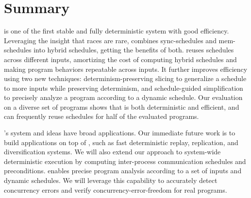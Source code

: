 \section{Summary} \label{sec:peregrine-summary}

\peregrine is one of the first stable and fully deterministic system with good
efficiency.
Leveraging the insight that races are rare, \peregrine combines sync-schedules
and mem-schedules into hybrid schedules, getting the benefits of both.
\peregrine reuses schedules across different inputs, amortizing the cost of
computing hybrid schedules and making program behaviors repeatable
across inputs.  It further improves
efficiency using two new techniques: determinism-preserving slicing to
generalize a schedule to more inputs while preserving determinism, and
schedule-guided simplification to precisely analyze a program according
to a dynamic schedule.  Our evaluation on a diverse set of programs
shows that \peregrine is both deterministic and efficient, and can frequently
reuse schedules for half of the evaluated programs.


\peregrine's system and ideas have broad applications.  Our immediate future
work is to build applications on top of \peregrine, such as fast deterministic
replay, replication, and diversification systems.  We will also extend our
approach to system-wide deterministic execution by computing inter-process
communication schedules and preconditions.  \peregrine enables precise program
analysis according to a set of inputs and dynamic schedules.  We will
leverage this capability to accurately detect concurrency errors and
verify concurrency-error-freedom for real programs.

